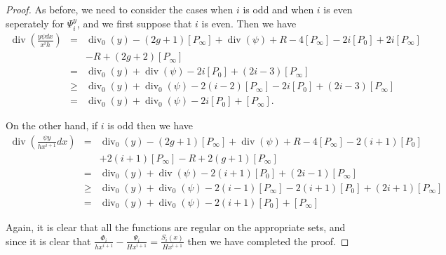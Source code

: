 \documentclass[draft, 11pt]{article} %
\theoremstyle{plain}
\theoremstyle{remark}
\DeclareMathOperator{\di}{div}
\begin{document}
\begin{proof}
As before, we need to consider the cases when $i$ is odd and when $i$ is even seperately for $\Psi_i^y$, and we first suppose that $i$ is even.
Then we have 
\begin{eqnarray*}
\di\left( \frac{y\psi dx}{x^ih} \right) & = & \di_0(y) - (2g+1)[P_\infty] + \di(\psi) + R - 4[P_\infty] - 2i[P_0] + 2i[P_\infty] \\
& & - R + (2g+2)[P_\infty] \\
& = & \di_0(y) + \di(\psi) -2i[P_0] + (2i-3)[P_\infty] \\
& \geq & \di_0(y) + \di_0(\psi) - 2(i-2)[P_\infty] - 2i[P_0] + (2i-3)[P_\infty] \\
& = & \di_0(y) + \di_0(\psi) -2i[P_0] + [P_\infty].
\end{eqnarray*}

On the other hand, if $i$ is odd then we have
\begin{eqnarray*}
\di \left( \frac{\psi y}{hx^{i+1}} dx \right) & = & \di_0(y) -(2g+1)[P_\infty] + \di(\psi) +R -4[P_\infty] - 2(i+1)[P_0] \\
&  & + 2(i+1)[P_\infty] - R + 2(g+1)[P_\infty] \\
& = & \di_0(y) + \di(\psi) -2(i+1)[P_0] + (2i-1)[P_\infty] \\
& \geq & \di_0(y) + \di_0(\psi) - 2(i-1)[P_\infty] - 2(i+1)[P_0] + (2i+1)[P_\infty] \\
& = & \di_0(y) + \di_0(\psi) - 2(i+1)[P_0] + [P_\infty]
\end{eqnarray*}


Again, it is clear that all the functions are regular on the appropriate sets, and since it is clear that $\frac{\Phi_i}{hx^{i+1}} - \frac{\Psi_i}{Hx^{i+1}} = \frac{S_i(x)}{Hx^{i+1}}$ then we have completed the proof.



\end{proof}



\begin{comment}
We define $\alpha^i_j$ and $\Alpha^i_{j+1}$ for $0 \leq j \leq 2g$, and $B_k^i$ for $1\leq k \leq g$, such that
\[
	$s_i(x) = \alpha^i_{2g}x^{2g} + \ldots + \alpha^i_0 \ {\rm and } \ S_i(x) = A_{2g+1}^ix^{2g+1} + \ldots + A^i_1 x + y(B_g^i x^i + \ldots + B_1^i x).
\] 
\end{comment}


	
\end{document}
